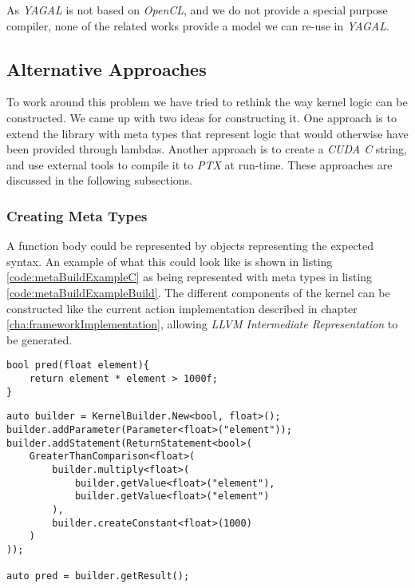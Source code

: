 As \textit{YAGAL} is not based on \textit{OpenCL}, and we do not provide a special purpose compiler, none of the related works provide a model we can re-use in \textit{YAGAL}.

\subsection{Alternative Approaches}
To work around this problem we have tried to rethink the way kernel logic can be constructed. We came up with two ideas for constructing it. One approach is to extend the library with meta types that represent logic that would otherwise have been provided through lambdas. Another approach is to create a \textit{CUDA C} string, and use external tools to compile it to \textit{PTX} at run-time. These approaches are discussed in the following subsections.

\subsubsection{Creating Meta Types}
A function body could be represented by objects representing the expected syntax. An example of what this could look like is shown in listing \ref{code:metaBuildExampleC} as being represented with meta types in listing \ref{code:metaBuildExampleBuild}. The different components of the kernel can be constructed like the current action implementation described in chapter \ref{cha:frameworkImplementation}, allowing \textit{LLVM Intermediate Representation} to be generated. 

\begin{lstlisting}[caption={Pseudo \textit{C} code showing a device function.}, label={code:metaBuildExampleC}]
bool pred(float element){
    return element * element > 1000f;
}
\end{lstlisting}

\begin{lstlisting}[caption={Code showing how construction of device function in a meta type solution could be done.}, label={code:metaBuildExampleBuild}]
auto builder = KernelBuilder.New<bool, float>();
builder.addParameter(Parameter<float>("element"));
builder.addStatement(ReturnStatement<bool>(
    GreaterThanComparison<float>(
        builder.multiply<float>(
            builder.getValue<float>("element"), 
            builder.getValue<float>("element")
        ), 
        builder.createConstant<float>(1000)
    )
));

auto pred = builder.getResult();
\end{lstlisting}

